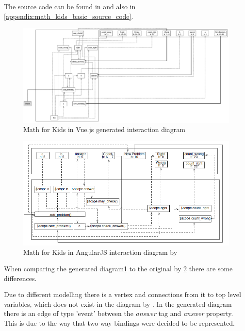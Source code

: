 The source code can be found in  and also in \ref{appendix:math_kids_basic_source_code}.
\begin{figure}[H]
    \includegraphics[width=\textwidth]{images/diagram_own_math_kids.png}
     \caption{Math for Kids in Vue.js generated interaction diagram }
     \label{fig:math_for_kids_own_interaction_diagram}
\end{figure}

\begin{figure}[H]
    \includegraphics[width=\textwidth]{images/interaction_diagram_zhang.png}
     \caption{Math for Kids in AngularJS interaction diagram by \textcite{zhang2019scenario}}
     \label{fig:math_for_kids_zhang_interaction_diagram}
\end{figure}

When comparing the generated diagram\ref{fig:math_for_kids_own_interaction_diagram} to the original by \textcite{zhang2019scenario} \ref{fig:math_for_kids_zhang_interaction_diagram} there are some differences.

Due to different modelling there is a  vertex and connections from it to top level variables, which does not exist in the diagram by \textcite{zhang2019scenario}. In the generated diagram there is an edge of type 'event' between the \textit{answer} tag and \textit{answer} property. This is due to the way that two-way bindings were decided to be represented.

